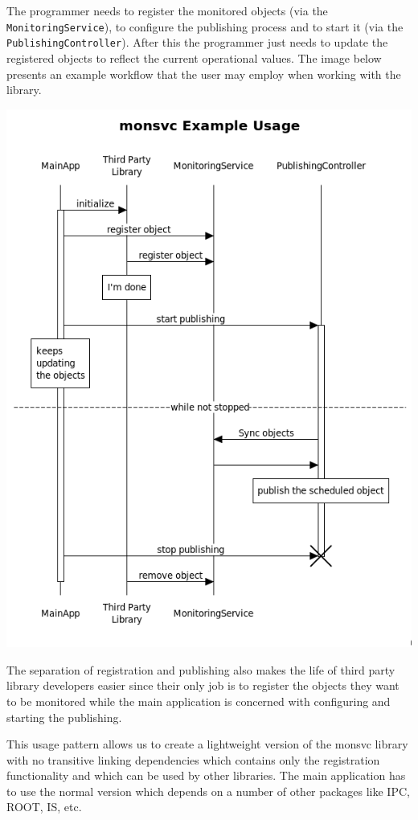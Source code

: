 The programmer needs to register the monitored objects (via the {\tt MonitoringService}), to configure the publishing process and to start it (via the {\tt PublishingController}). After this the programmer just needs to update the registered objects to reflect the current operational values. The image below presents an example workflow that the user may employ when working with the library.  

\begin{center}
\includegraphics[scale=0.6]{Images/workflow.png}
\end{center}

The separation of registration and publishing also makes the life of third party library developers easier since their only job is to register the objects they want to be monitored while the main application is concerned with configuring and starting the publishing.

This usage pattern allows us to  create a lightweight version of the monsvc library with no transitive linking dependencies which contains only the registration functionality and which can be used by other libraries. The main application has to use the normal version which depends on a number of other packages like IPC, ROOT, IS, etc.
